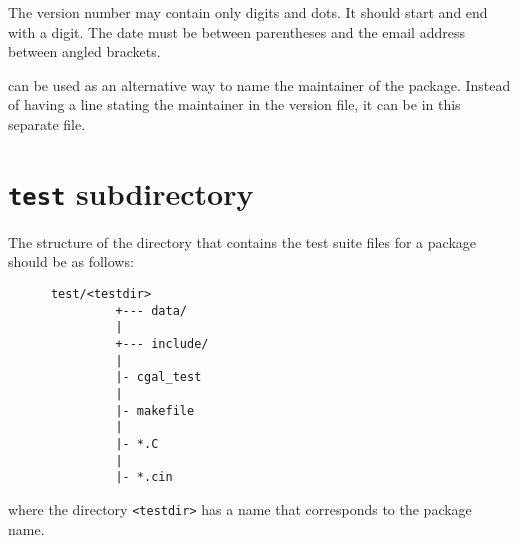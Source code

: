 \begin{description}
       The version number may contain only digits and dots. It should start and 
       end with a digit. The date must be between parentheses and the email
       address between angled brackets. 
  \item[\ccAnchor{example/maintainer}{{\tt maintainer}}]%
       can be used as an alternative way to name the
       maintainer of the package. Instead of having a line stating the
       maintainer in the version file, it can be in this separate file.
\end{description}

\section{{\tt test} subdirectory}
\label{sec:test_subdirectory}

The structure of the directory that contains the test suite files for 
a package should be as follows: 

\begin{verbatim}
      test/<testdir>
               +--- data/
               |
               +--- include/
               |
               |- cgal_test
               |
               |- makefile
               |
               |- *.C
               |
               |- *.cin
\end{verbatim}
where the directory \verb|<testdir>| has a name that corresponds to the package
name.

